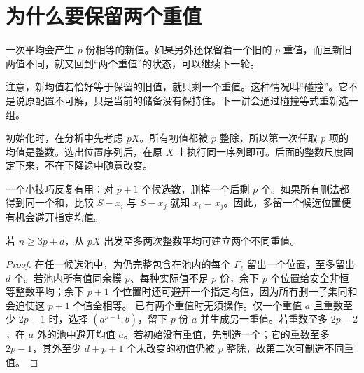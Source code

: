 \section{为什么要保留两个重值}
一次平均会产生 $p$ 份相等的新值。如果另外还保留着一个旧的 $p$ 重值，而且新旧两值不同，就又回到“两个重值”的状态，可以继续下一轮。

注意，新均值若恰好等于保留的旧值，就只剩一个重值。这种情况叫“碰撞”。它不是说原配置不可解，只是当前的储备没有保持住。下一讲会通过碰撞等式重新选一组。

初始化时，在分析中先考虑 $pX$。所有初值都被 $p$ 整除，所以第一次任取 $p$ 项的均值是整数。选出位置序列后，在原 $X$ 上执行同一序列即可。后面的整数尺度固定下来，不在下降途中随意改变。

一个小技巧反复有用：对 $p+1$ 个候选数，删掉一个后剩 $p$ 个。如果所有删法都得到同一个和，比较 $S-x_i$ 与 $S-x_j$ 就知 $x_i=x_j$。因此，多留一个候选位置便有机会避开指定均值。
\begin{lemma}[建立两个不同重值]\label{lem:initialize}
若 $n\ge3p+d$，从 $pX$ 出发至多两次整数平均可建立两个不同重值。
\end{lemma}
\begin{proof}
在任一候选池中，为仍完整包含在池内的每个 $F_\ell$ 留出一个位置，至多留出 $d$ 个。若池内所有值同余模 $p$、每种实际值不足 $p$ 份，余下 $p$ 个位置给安全非恒等整数平均；余下 $p+1$ 个位置时还可避开一个指定均值，因为所有删一子集同和会迫使这 $p+1$ 个值全相等。
已有两个重值时无须操作。仅一个重值 $a$ 且重数至少 $2p-1$ 时，选择 $(a^{p-1},b)$，留下 $p$ 份 $a$ 并生成另一重值。若重数至多 $2p-2$，在 $a$ 外的池中避开均值 $a$。若初始没有重值，先制造一个；它的重数至多 $2p-1$，其外至少 $d+p+1$ 个未改变的初值仍被 $p$ 整除，故第二次可制造不同重值。
\end{proof}

